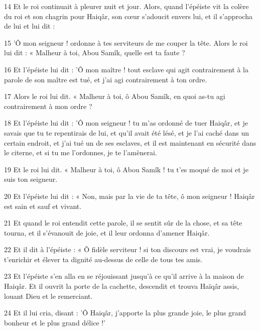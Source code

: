 \par 14 Et le roi continuait à pleurer nuit et jour. Alors, quand l'épéiste vit la colère du roi et son chagrin pour Haiqâr, son cœur s'adoucit envers lui, et il s'approcha de lui et lui dit :

\par 15 'Ô mon seigneur ! ordonne à tes serviteurs de me couper la tête. Alors le roi lui dit : « Malheur à toi, Abou Samîk, quelle est ta faute ?

\par 16 Et l'épéiste lui dit : 'Ô mon maître ! tout esclave qui agit contrairement à la parole de son maître est tué, et j'ai agi contrairement à ton ordre.

\par 17 Alors le roi lui dit. « Malheur à toi, ô Abou Samîk, en quoi as-tu agi contrairement à mon ordre ?

\par 18 Et l'épéiste lui dit : 'Ô mon seigneur ! tu m'as ordonné de tuer Haiqâr, et je savais que tu te repentirais de lui, et qu'il avait été lésé, et je l'ai caché dans un certain endroit, et j'ai tué un de ses esclaves, et il est maintenant en sécurité dans le citerne, et si tu me l'ordonnes, je te l'amènerai.

\par 19 Et le roi lui dit. « Malheur à toi, ô Abou Samîk ! tu t'es moqué de moi et je suis ton seigneur.

\par 20 Et l'épéiste lui dit : « Non, mais par la vie de ta tête, ô mon seigneur ! Haiqâr est sain et sauf et vivant.

\par 21 Et quand le roi entendit cette parole, il se sentit sûr de la chose, et sa tête tourna, et il s'évanouit de joie, et il leur ordonna d'amener Haiqâr.

\par 22 Et il dit à l'épéiste : « Ô fidèle serviteur ! si ton discours est vrai, je voudrais t'enrichir et élever ta dignité au-dessus de celle de tous tes amis.

\par 23 Et l'épéiste s'en alla en se réjouissant jusqu'à ce qu'il arrive à la maison de Haiqâr. Et il ouvrit la porte de la cachette, descendit et trouva Haïqâr assis, louant Dieu et le remerciant.

\par 24 Et il lui cria, disant : 'Ô Haiqâr, j'apporte la plus grande joie, le plus grand bonheur et le plus grand délice !'

